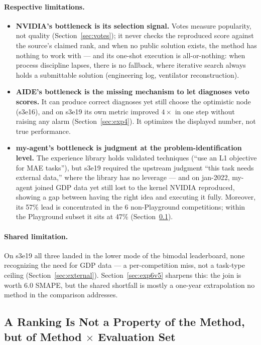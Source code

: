 \documentclass[11pt,a4paper]{article}
\begin{document}
\paragraph{Respective limitations.}
\begin{itemize}[leftmargin=*]
\item \textbf{NVIDIA's bottleneck is its selection signal.} Votes measure popularity, not quality (Section~\ref{sec:votes}); it never checks the reproduced score against the source's claimed rank, and when no public solution exists, the method has nothing to work with --- and its one-shot execution is all-or-nothing: when process discipline lapses, there is no fallback, where iterative search always holds a submittable solution (engineering log, ventilator reconstruction).
\item \textbf{AIDE's bottleneck is the missing mechanism to let diagnoses veto scores.} It can produce correct diagnoses yet still choose the optimistic node (s3e16), and on s3e19 its own metric improved $4\times$ in one step without raising any alarm (Section~\ref{sec:exp4}). It optimizes the displayed number, not true performance.
\item \textbf{my-agent's bottleneck is judgment at the problem-identification level.} The experience library holds validated techniques (``use an L1 objective for MAE tasks''), but s3e19 required the upstream judgment ``this task needs external data,'' where the library has no leverage --- and on jan-2022, my-agent joined GDP data yet still lost to the kernel NVIDIA reproduced, showing a gap between having the right idea and executing it fully. Moreover, its 57\% lead is concentrated in the 6 non-Playground competitions; within the Playground subset it sits at 47\% (Section~\ref{sec:reversal}).
\end{itemize}

\paragraph{Shared limitation.} On s3e19 all three landed in the lower mode of the bimodal leaderboard, none recognizing the need for GDP data --- a per-competition miss, not a task-type ceiling (Section~\ref{sec:external}). Section~\ref{sec:exp6v5} sharpens this: the join is worth $6.0$ SMAPE, but the shared shortfall is mostly a one-year extrapolation no method in the comparison addresses.

\subsection{A Ranking Is Not a Property of the Method, but of Method $\times$ Evaluation Set}
\label{sec:reversal}
\end{document}
